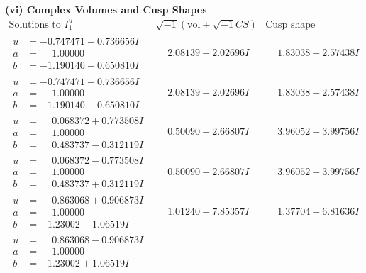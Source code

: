 \documentclass[1p]{elsarticle_modified}
\theoremstyle{definition}
\newcommand{\I}{\sqrt{-1}}
\begin{document}
\newpage\flushleft \textbf{(vi) Complex Volumes and Cusp Shapes}
$$\begin{array}{c|c|c}  
\text{Solutions to }I^u_{1}& \I (\text{vol} + \sqrt{-1}CS) & \text{Cusp shape}\\
 \hline 
\begin{aligned}
u &= -0.747471 + 0.736656 I \\
a &= \phantom{-}1.00000\phantom{ +0.000000I} \\
b &= -1.190140 + 0.650810 I\end{aligned}
 & \phantom{-}2.08139 - 2.02696 I & \phantom{-}1.83038 + 2.57438 I \\ \hline\begin{aligned}
u &= -0.747471 - 0.736656 I \\
a &= \phantom{-}1.00000\phantom{ +0.000000I} \\
b &= -1.190140 - 0.650810 I\end{aligned}
 & \phantom{-}2.08139 + 2.02696 I & \phantom{-}1.83038 - 2.57438 I \\ \hline\begin{aligned}
u &= \phantom{-}0.068372 + 0.773508 I \\
a &= \phantom{-}1.00000\phantom{ +0.000000I} \\
b &= \phantom{-}0.483737 - 0.312119 I\end{aligned}
 & \phantom{-}0.50090 - 2.66807 I & \phantom{-}3.96052 + 3.99756 I \\ \hline\begin{aligned}
u &= \phantom{-}0.068372 - 0.773508 I \\
a &= \phantom{-}1.00000\phantom{ +0.000000I} \\
b &= \phantom{-}0.483737 + 0.312119 I\end{aligned}
 & \phantom{-}0.50090 + 2.66807 I & \phantom{-}3.96052 - 3.99756 I \\ \hline\begin{aligned}
u &= \phantom{-}0.863068 + 0.906873 I \\
a &= \phantom{-}1.00000\phantom{ +0.000000I} \\
b &= -1.23002 - 1.06519 I\end{aligned}
 & \phantom{-}1.01240 + 7.85357 I & \phantom{-}1.37704 - 6.81636 I \\ \hline\begin{aligned}
u &= \phantom{-}0.863068 - 0.906873 I \\
a &= \phantom{-}1.00000\phantom{ +0.000000I} \\
b &= -1.23002 + 1.06519 I\end{aligned}

\end{array}$$
\end{document}
